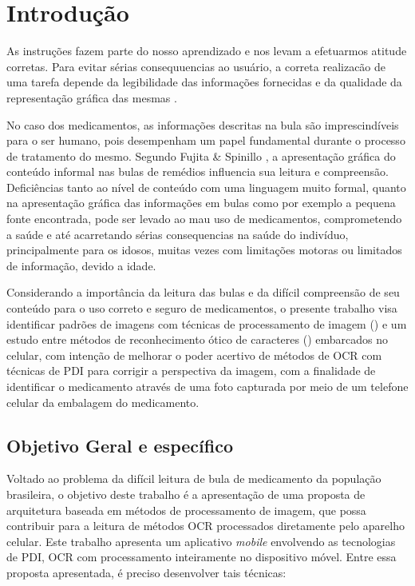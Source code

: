 \chapter{Introdução}\label{ch:intro}

As instruções fazem parte do nosso aprendizado e nos levam a efetuarmos atitude corretas. Para evitar sérias consequuencias ao usuário, a correta realizacão de uma tarefa depende da legibilidade das informações fornecidas e da qualidade da representação gráfica das mesmas \cite{FUJITA2007}.


No caso dos medicamentos, as informações descritas na bula são imprescindíveis para o ser humano, pois desempenham um papel fundamental durante o processo de tratamento do mesmo. Segundo Fujita & Spinillo \cite{FUJITA2006}, a apresentação gráfica do conteúdo informal nas bulas de remédios influencia sua leitura e compreensão. Deficiências tanto ao nível de conteúdo com uma linguagem muito formal, quanto na apresentação gráfica das informações em bulas como por exemplo a pequena fonte encontrada, pode ser levado ao mau uso de medicamentos, comprometendo a saúde e até acarretando sérias consequencias na saúde do indivíduo, principalmente para os idosos, muitas vezes com limitações motoras ou limitados de informação, devido a idade. 



Considerando a importância da leitura das bulas e da difícil compreensão de seu conteúdo para o uso correto e seguro de medicamentos, o presente trabalho visa identificar padrões de imagens com técnicas de processamento de imagem ()  e um estudo entre métodos de reconhecimento ótico de caracteres () embarcados no celular, com intenção de melhorar o poder acertivo de métodos de OCR com técnicas de PDI para corrigir a perspectiva da imagem, com a finalidade de identificar o medicamento através de uma foto capturada por meio de um telefone celular da embalagem do medicamento.




\section{Objetivo Geral e específico}
Voltado ao problema da difícil leitura de bula  de medicamento da população brasileira, o objetivo deste trabalho é a apresentação de uma proposta de arquitetura baseada em métodos de processamento de imagem, que possa contribuir para a leitura de métodos OCR processados diretamente pelo aparelho celular.
Este trabalho apresenta um aplicativo \textit{mobile} envolvendo as tecnologias de PDI, OCR com processamento inteiramente no dispositivo móvel. Entre essa proposta apresentada, é preciso desenvolver tais técnicas:

